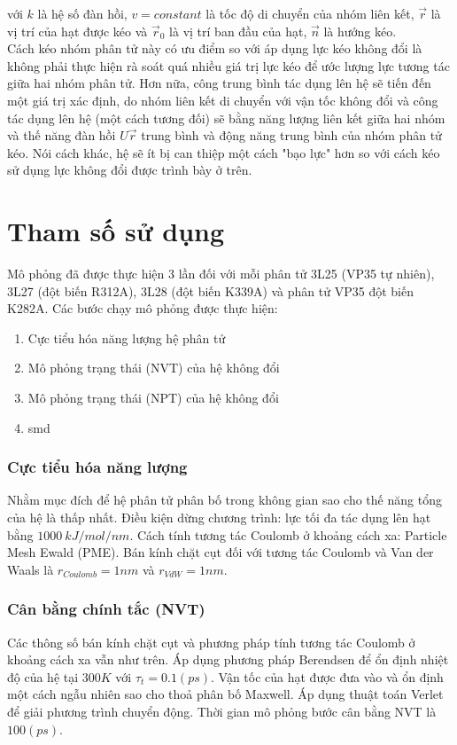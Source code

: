 \documentclass[12pt,a4paper,reqno, oneside]{book}
\begin{document}
	với $k$ là hệ số đàn hồi, $v=constant$ là tốc độ di chuyển của nhóm liên kết, $\vec{r}$ là vị trí của hạt được kéo và $\vec{r}_{0}$ là vị trí ban đầu của hạt, $\vec{n}$ là hướng kéo.\\
	Cách kéo nhóm phân tử này có ưu điểm so với áp dụng lực kéo không đổi là không phải thực hiện rà soát quá nhiều giá trị lực kéo để ước lượng lực tương tác giữa hai nhóm phân tử. Hơn nữa, công trung bình tác dụng lên hệ sẽ tiến đến một giá trị xác định, do nhóm liên kết di chuyển với vận tốc không đổi và công tác dụng lên hệ (một cách tương đối) sẽ bằng năng lượng liên kết giữa hai nhóm và thế năng đàn hồi $U\vec{r}$ trung bình và động năng trung bình của nhóm phân tử kéo. Nói cách khác, hệ sẽ ít bị can thiệp một cách "bạo lực" hơn so với cách kéo sử dụng lực không đổi được trình bày ở trên.
\section{Tham số sử dụng}
Mô phỏng đã được thực hiện 3 lần đối với mỗi phân tử 3L25 (VP35 tự nhiên), 3L27 (đột biến \gls{R312A}), 3L28 (đột biến \gls{K339A}) và phân tử VP35 đột biến \gls{K282A}.
Các bước chạy mô phỏng được thực hiện:
\begin{enumerate}
\item Cực tiểu hóa năng lượng hệ phân tử
\item Mô phỏng trạng thái (NVT) của hệ không đổi
\item Mô phỏng trạng thái (NPT) của hệ không đổi
\item \gls{smd}
\end{enumerate}
\subsubsection{Cực tiểu hóa năng lượng}
Nhằm mục đích để hệ phân tử phân bố trong không gian sao cho thế năng tổng của hệ là thấp nhất. Điều kiện dừng chương trình: lực tối đa tác dụng lên hạt bằng $1000\ kJ/mol/nm$. Cách tính tương tác Coulomb ở khoảng cách xa: Particle Mesh Ewald (PME). Bán kính chặt cụt đối với tương tác Coulomb và Van der Waals là $r_{Coulomb}=1nm$ và $r_{VdW}=1nm$.
\subsubsection{Cân bằng chính tắc (NVT)}
Các thông số bán kính chặt cụt và phương pháp tính tương tác Coulomb ở khoảng cách xa vẫn như trên. Áp dụng phương pháp Berendsen để ổn định nhiệt độ của hệ tại $300K$ với $\tau_{t}=0.1\left(ps\right)$. Vận tốc của hạt được đưa vào và ổn định một cách ngẫu nhiên sao cho thoả phân bố Maxwell. Áp dụng thuật toán Verlet để giải phương trình chuyển động. Thời gian mô phỏng bước cân bằng NVT là $100\left(ps\right)$.
\end{document}
